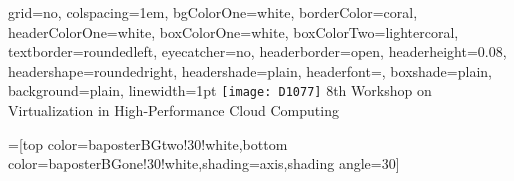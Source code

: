 \documentclass[a4shrink,portrait,final]{baposter}
\begin{document}
\newlength{\leftimgwidth}
\begin{poster}%
  {
  grid=no,
  colspacing=1em,
  bgColorOne=white,
  borderColor=coral,
  headerColorOne=white,
  boxColorOne=white,
  boxColorTwo=lightercoral,
  textborder=roundedleft,
  eyecatcher=no,
  headerborder=open,
  headerheight=0.08\textheight,
  headershape=roundedright,
  headershade=plain,
  headerfont=\Large\textsf, %
  boxshade=plain,
  background=plain,
  linewidth=1pt
  }
  {\texttt{[image: D1077]}} %
  {\sf %
  \vspace{2em}
  8th Workshop on Virtualization in High-Performance Cloud Computing}
  {\sf %
  }
  {%
    \makebox[8em][r]{%
      \begin{minipage}{16em}
        \hfill
      \end{minipage}
    }
  }

  =[top color=baposterBGtwo!30!white,bottom color=baposterBGone!30!white,shading=axis,shading angle=30]

     \setlength{\leftimgwidth}{0.78em+8.0em}

    \newcommand{\colouredcircle}[1]{%
      \tikz{\useasboundingbox (-0.2em,-0.32em) rectangle(0.2em,0.32em); \draw[draw=black,fill=baposterBGone!80!black!#1!white,line width=0.03em] (0,0) circle(0.18em);}}


\end{poster}
\end{document}

